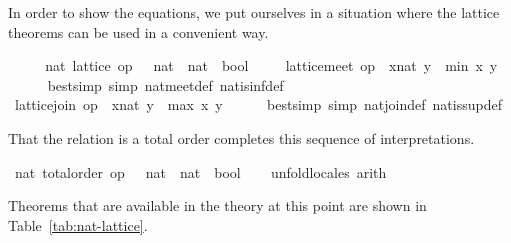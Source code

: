\begin{isabellebody}
\begin{isamarkuptxt}%
In order to show the equations, we put ourselves in a
    situation where the lattice theorems can be used in a convenient way.%
\end{isamarkuptxt}%
\isamarkuptrue%
\ \ \isamarkupfalse%
\ \isamarkupfalse%
\ nat{\isacharcolon}\ lattice\ {\isachardoublequoteopen}op\ {\isasymle}\ {\isacharcolon}{\isacharcolon}\ nat\ {\isasymRightarrow}\ nat\ {\isasymRightarrow}\ bool{\isachardoublequoteclose}\ \isacommand{{\isachardot}}\isamarkupfalse%
\isanewline
\ \ \isamarkupfalse%
\ {\isachardoublequoteopen}lattice{\isachardot}meet\ op\ {\isasymle}\ {\isacharparenleft}x{\isacharcolon}{\isacharcolon}nat{\isacharparenright}\ y\ {\isacharequal}\ min\ x\ y{\isachardoublequoteclose}\isanewline
\ \ \ \ \isamarkupfalse%
\ {\isacharparenleft}bestsimp\ simp{\isacharcolon}\ nat{\isachardot}meet{\isacharunderscore}def\ nat{\isachardot}is{\isacharunderscore}inf{\isacharunderscore}def{\isacharparenright}\isanewline
\ \ \isamarkupfalse%
\ {\isachardoublequoteopen}lattice{\isachardot}join\ op\ {\isasymle}\ {\isacharparenleft}x{\isacharcolon}{\isacharcolon}nat{\isacharparenright}\ y\ {\isacharequal}\ max\ x\ y{\isachardoublequoteclose}\isanewline
\ \ \ \ \isamarkupfalse%
\ {\isacharparenleft}bestsimp\ simp{\isacharcolon}\ nat{\isachardot}join{\isacharunderscore}def\ nat{\isachardot}is{\isacharunderscore}sup{\isacharunderscore}def{\isacharparenright}\isanewline
{}\isamarkupfalse%
%
\endisatagvisible
{\isafoldvisible}%
%
\isadelimvisible
%
\endisadelimvisible
%
\begin{isamarkuptext}%
That the relation \isa{{\isasymle}} is a total order completes this
  sequence of interpretations.%
\end{isamarkuptext}%
\isamarkuptrue%
%
\isadelimvisible
%
\endisadelimvisible
%
\isatagvisible
{}\isamarkupfalse%
\ nat{\isacharcolon}\ total{\isacharunderscore}order\ {\isachardoublequoteopen}op\ {\isasymle}\ {\isacharcolon}{\isacharcolon}\ nat\ {\isasymRightarrow}\ nat\ {\isasymRightarrow}\ bool{\isachardoublequoteclose}\isanewline
\ \ \isamarkupfalse%
\ unfold{\isacharunderscore}locales\ arith%
\endisatagvisible
{\isafoldvisible}%
%
\isadelimvisible
%
\endisadelimvisible
%
\begin{isamarkuptext}%
Theorems that are available in the theory at this point are shown in
  Table~\ref{tab:nat-lattice}.


\end{isamarkuptext}
\end{isabellebody}
